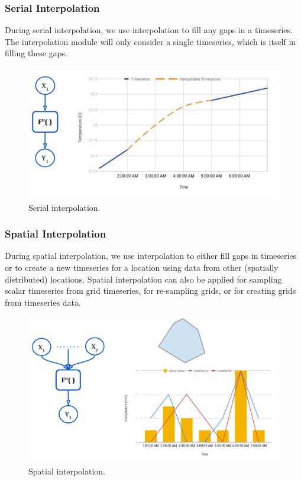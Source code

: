 \subsubsection{Serial Interpolation}
During serial interpolation, we use interpolation to fill any gaps in a timeseries. The interpolation module will only consider a single timeseries, which is itself in filling these gaps.

\begin{figure}[htp]
    \centering
    \includegraphics[width=1.0\textwidth]{method/data_preprocess/serial_interpolation.pdf}
    \caption{Serial interpolation.}
    \label{fi:serial_interpolation}
\end{figure}

\subsubsection{Spatial Interpolation}
During spatial interpolation, we use interpolation to either fill gaps in timeseries or to create a new timeseries for a location using data from other (spatially distributed) locations. Spatial interpolation can also be applied for sampling scalar timeseries from grid timeseries, for re-sampling grids, or for creating grids from timeseries data.
\begin{figure}[htp]
    \centering
    \includegraphics[width=1.0\textwidth]{method/data_preprocess/spatial_interpolation.pdf}
    \caption{Spatial interpolation.}
    \label{fi:spatial_interpolation}
\end{figure}

